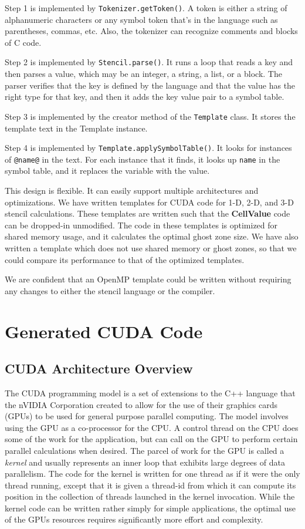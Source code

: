 \documentclass{styles/sig-alternate}
\begin{document}
Step 1 is implemented by {\tt Tokenizer.getToken()}.  A token is
either a string of alphanumeric characters or any symbol token that's
in the language such as parentheses, commas, etc.  Also, the tokenizer
can recognize comments and blocks of C code.

Step 2 is implemented by {\tt Stencil.parse()}.  It runs a loop that
reads a key and then parses a value, which may be an integer, a
string, a list, or a block.  The parser verifies that the key is
defined by the language and that the value has the right type for that
key, and then it adds the key value pair to a symbol table.

Step 3 is implemented by the creator method of the {\tt Template}
class.  It stores the template text in the Template instance.

Step 4 is implemented by {\tt Template.applySymbolTable()}.  It looks
for instances of {\tt @name@} in the text.  For each instance that it
finds, it looks up {\tt name} in the symbol table, and it replaces the
variable with the value.

This design is flexible.  It can easily support multiple architectures
and optimizations.  We have written templates for CUDA code for 1-D,
2-D, and 3-D stencil calculations.  These templates are written such
that the {\bf CellValue} code can be dropped-in unmodified.  The code
in these templates is optimized for shared memory usage, and it
calculates the optimal ghost zone size.  We have also written a
template which does not use shared memory or ghost zones, 
so that we could compare
its performance to that of the optimized templates.

We are confident that an OpenMP template could be written without
requiring any changes to either the stencil language or the compiler.

\section{Generated CUDA Code}

\subsection{CUDA Architecture Overview}

The CUDA programming model is a set of extensions to the C++ language that
the nVIDIA Corporation created to allow for the use of
their graphics cards (GPUs) to be used for general purpose parallel 
computing.
The model involves using the GPU as a co-processor for the CPU.
A control thread on the CPU does some of the work for the application, 
but can call on the GPU to perform certain parallel calculations
when desired.  The parcel of work for the GPU is called a {\em kernel}
and usually represents an inner loop that exhibits large degrees of
data parallelism.  The code for the kernel is written for one thread
as if it were the only thread running, except that it is given a
thread-id from which it can compute its position in the collection of
threads launched in the kernel invocation.  While the kernel code can
be written rather simply for simple applications, the optimal use of the
GPUs resources requires significantly more effort and complexity.
\end{document}
